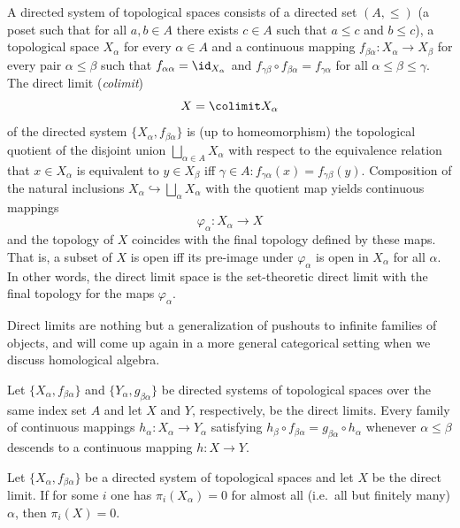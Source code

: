 \begin{defn}
    A directed system of topological spaces consists of a directed set $(A,\leq)$ (a poset such that for all $a,b\in A$ there exists $c\in A$ such that $a\leq c$ and $b\leq c$), a topological space $X_\alpha$ for every $\alpha \in A$ and a continuous mapping $f_{\beta\alpha}:X_\alpha\to X_\beta$ for every pair $\alpha\leq\beta$ such that $f_{\alpha\alpha}=\id_{X_\alpha}$ and $f_{\gamma\beta}\circ f_{\beta\alpha}=f_{\gamma\alpha}$ for all $\alpha\leq\beta\leq \gamma$. The direct limit (\textit{colimit})
    \[X=\colimit X_\alpha\]
    of the directed system $\{X_\alpha,f_{\beta\alpha}\}$ is (up to homeomorphism) the topological quotient of the disjoint union $\bigsqcup_{\alpha\in A} X_\alpha$ with respect to the equivalence relation that $x\in X_\alpha$ is equivalent to $y\in X_\beta$ iff $\gamma\in A: f_{\gamma\alpha}(x)=f_{\gamma\beta} (y)$. Composition of the natural inclusions $X_\alpha\hookrightarrow \bigsqcup_\alpha X_\alpha$ with the quotient map yields continuous mappings
    \[\varphi_\alpha:X_\alpha\to X\]
    and the topology of $X$ coincides with the final topology defined by these maps. That is, a subset of $X$ is open iff its pre-image under $\varphi_\alpha$ is open in $X_\alpha$ for all $\alpha$. In other words, the direct limit space is the set-theoretic direct limit with the final topology for the maps $\varphi_{\alpha}$.
\end{defn}

Direct limits are nothing but a generalization of pushouts to infinite families of objects, and will come up again in a more general categorical setting when we discuss homological algebra.


\begin{prop}[{{\cite[Prop.~3.1.14]{RS2}}}]\label{prop 3.1.14 RS2}
    Let $\{X_\alpha,f_{\beta\alpha}\}$ and $\{Y_\alpha,g_{\beta\alpha}\}$ be directed systems of topological spaces over the same index set $A$ and let $X$ and $Y$, respectively, be the direct limits. Every family of continuous mappings $h_\alpha:X_\alpha\to Y_\alpha$ satisfying $h_\beta \circ f_{\beta\alpha}=g_{\beta\alpha}\circ h_\alpha$ whenever $\alpha\leq \beta$ descends to a continuous mapping $h:X\to Y$.
\end{prop}

\begin{prop}[{{\cite[Prop.~3.1.15]{RS2}}}]\label{prop 3.1.15 RS2}
    Let $\{X_\alpha,f_{\beta\alpha}\}$ be a directed system of topological spaces and let $X$ be the direct limit. If for some $i$ one has $\pi_i(X_\alpha)=0$ for almost all (i.e.\ all but finitely many) $\alpha$, then $\pi_i(X)=0$.
\end{prop}


